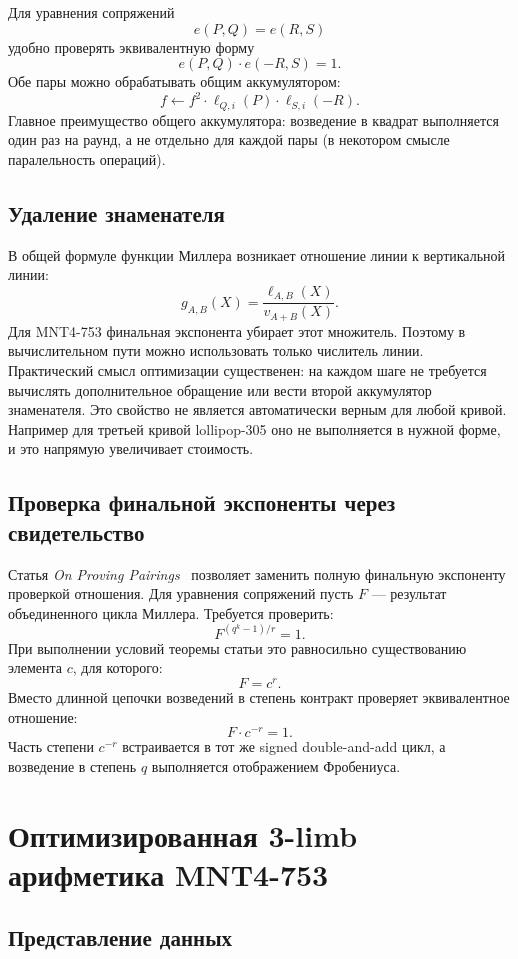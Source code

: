 \documentclass[12pt,a4paper]{article}
\begin{document}
Для уравнения сопряжений
\[
    e(P,Q)=e(R,S)
\]
удобно проверять эквивалентную форму
\[
    e(P,Q)\cdot e(-R,S)=1.
\]
Обе пары можно обрабатывать общим аккумулятором:
\[
    f \leftarrow
    f^2\cdot \ell_{Q,i}(P)\cdot \ell_{S,i}(-R).
\]
Главное преимущество общего аккумулятора: возведение в квадрат выполняется
один раз на раунд, а не отдельно для каждой пары (в некотором смысле паралельность операций).

\subsection{Удаление знаменателя}

В общей формуле функции Миллера возникает отношение линии к вертикальной
линии:
\[
    g_{A,B}(X)=\frac{\ell_{A,B}(X)}{v_{A+B}(X)}.
\]
Для MNT4-753 финальная экспонента убирает этот множитель. Поэтому в вычислительном пути
можно использовать только числитель линии. Практический смысл оптимизации существенен: на каждом шаге не требуется вычислять дополнительное обращение или вести второй аккумулятор знаменателя.
Это свойство не является автоматически верным для любой кривой. Например для третьей кривой lollipop-305 оно не выполняется в нужной форме, и это напрямую увеличивает стоимость.


\subsection{Проверка финальной экспоненты через свидетельство}

Статья \emph{On Proving Pairings}~\cite{eprint640} позволяет заменить полную
финальную экспоненту проверкой отношения. Для уравнения сопряжений пусть $F$ ---
результат объединенного цикла Миллера. Требуется проверить:
\[
    F^{(q^k-1)/r}=1.
\]
При выполнении условий теоремы статьи это равносильно существованию элемента
$c$, для которого:
\[
    F=c^r.
\]
Вместо длинной цепочки возведений в степень контракт проверяет эквивалентное
отношение:
\[
    F\cdot c^{-r}=1.
\]
Часть степени $c^{-r}$ встраивается в тот же signed double-and-add цикл, а
возведение в степень $q$ выполняется отображением Фробениуса.

\section{Оптимизированная 3-limb арифметика MNT4-753}

\subsection{Представление данных}
\end{document}

